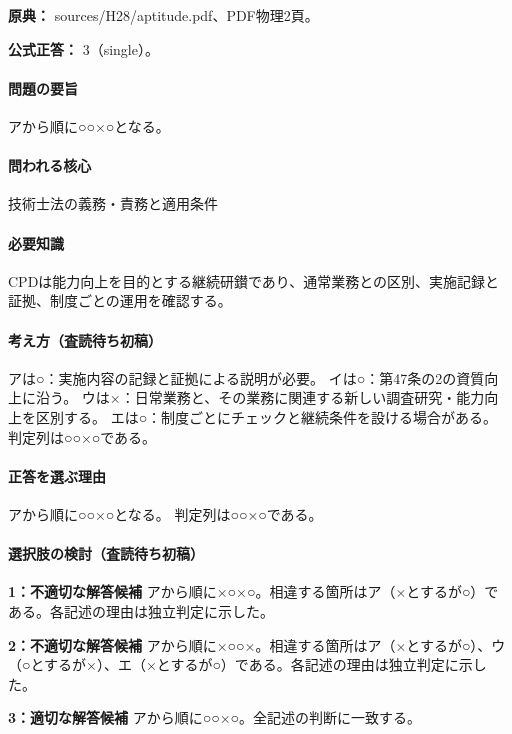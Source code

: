 \noindent\textbf{原典：} sources/H28/aptitude.pdf、PDF物理2頁。

\textbf{公式正答：} 3（single）。

\paragraph{問題の要旨} アから順に○○×○となる。

\paragraph{問われる核心} 技術士法の義務・責務と適用条件

\paragraph{必要知識} CPDは能力向上を目的とする継続研鑚であり、通常業務との区別、実施記録と証拠、制度ごとの運用を確認する。

\paragraph{考え方（査読待ち初稿）} アは○：実施内容の記録と証拠による説明が必要。 イは○：第47条の2の資質向上に沿う。 ウは×：日常業務と、その業務に関連する新しい調査研究・能力向上を区別する。 エは○：制度ごとにチェックと継続条件を設ける場合がある。 判定列は○○×○である。

\paragraph{正答を選ぶ理由} アから順に○○×○となる。  判定列は○○×○である。

\paragraph{選択肢の検討（査読待ち初稿）}

\noindent\textbf{1：不適切な解答候補} アから順に×○×○。相違する箇所はア（×とするが○）である。各記述の理由は独立判定に示した。\par

\noindent\textbf{2：不適切な解答候補} アから順に×○○×。相違する箇所はア（×とするが○）、ウ（○とするが×）、エ（×とするが○）である。各記述の理由は独立判定に示した。\par

\noindent\textbf{3：適切な解答候補} アから順に○○×○。全記述の判断に一致する。\par

